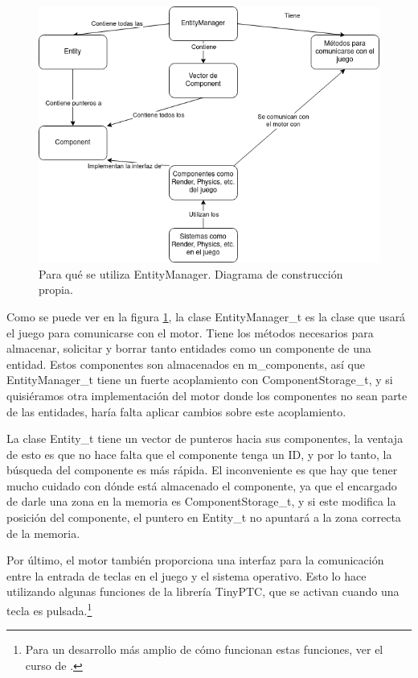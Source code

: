 \begin{figure}[H]
	\centering
	\includegraphics[width=15cm]{archivos/imagenes/Diagrama-funcionamiento-motor.png}
	\caption{Para qué se utiliza EntityManager. Diagrama de construcción propia.}
	\label{diagrama entitymanager}
\end{figure}

Como se puede ver en la figura \ref{diagrama entitymanager}, la clase EntityManager\_t es la clase que usará el juego para comunicarse con el motor. Tiene los métodos necesarios para almacenar, solicitar y borrar tanto entidades como un componente de una entidad. Estos componentes son almacenados en m\_components, así que EntityManager\_t tiene un fuerte acoplamiento con ComponentStorage\_t, y si quisiéramos otra implementación del motor donde los componentes no sean parte de las entidades, haría falta aplicar cambios sobre este acoplamiento.

La clase Entity\_t tiene un vector de punteros hacia sus componentes, la ventaja de esto es que no hace falta que el componente tenga un ID, y por lo tanto, la búsqueda del componente es más rápida. El inconveniente es que hay que tener mucho cuidado con dónde está almacenado el componente, ya que el encargado de darle una zona en la memoria es ComponentStorage\_t, y si este modifica la posición del componente, el puntero en Entity\_t no apuntará a la zona correcta de la memoria. 

Por último, el motor también proporciona una interfaz para la comunicación entre la entrada de teclas en el juego y el sistema operativo. Esto lo hace utilizando algunas funciones de la librería TinyPTC, que se activan cuando una tecla es pulsada.\footnote{Para un desarrollo más amplio de cómo funcionan estas funciones, ver el curso de \cite{CursoMotorC++}.}

